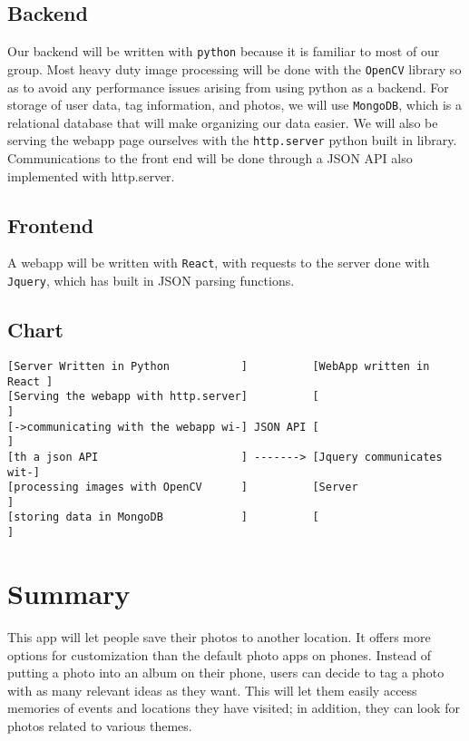 \documentclass{article}
\begin{document}
\subsection{Backend}
Our backend will be written with \texttt{python} because it is familiar to most
of our group. Most heavy duty image processing will be done with the
\texttt{OpenCV} library so as to avoid any performance issues arising from using
python as a backend. For storage of user data, tag information, and photos, we
will use \texttt{MongoDB}, which is a relational database that will make
organizing our data easier. We will also be serving the webapp page ourselves
with the \texttt{http.server} python built in library. Communications to the
front end will be done through a JSON API also implemented with http.server.

\subsection{Frontend}
A webapp will be written with \texttt{React}, with requests to the server done
with \texttt{Jquery}, which has built in JSON parsing functions.

\subsection{Chart}
\begin{verbatim}
[Server Written in Python           ]          [WebApp written in React ]
[Serving the webapp with http.server]          [                        ]
[->communicating with the webapp wi-] JSON API [                        ]
[th a json API                      ] -------> [Jquery communicates wit-]
[processing images with OpenCV      ]          [Server                  ]
[storing data in MongoDB            ]          [                        ]
\end{verbatim}

\section{Summary}
This app will let people save their photos to another location. It offers more
options for customization than the default photo apps on phones.
Instead of putting a photo into an album on their phone, users can decide to tag
a photo with as many relevant ideas as they want. This will let them easily access
memories of events and locations they have visited; in addition, they can look
for photos related to various themes.
\end{document}
